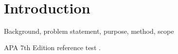\section{Introduction}
Background, problem statement, purpose, method, scope

APA 7th Edition reference test \parencite{banker2004balanced}.
